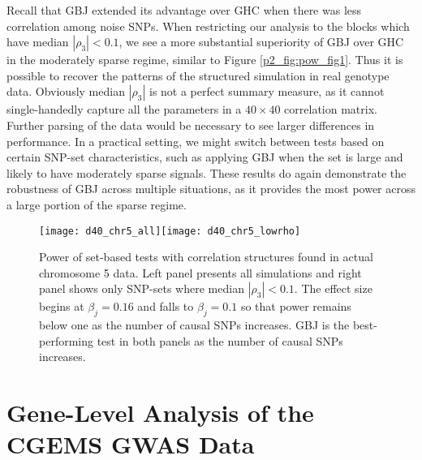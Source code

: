 \documentclass[12pt]{article}
\begin{document}
Recall that GBJ extended its advantage over GHC when there was less correlation among noise SNPs.
When restricting our analysis to the blocks which have median $|\rho_{3}| < 0.1$, we see
a more substantial superiority of GBJ over GHC in the moderately sparse regime, similar to Figure 
\ref{p2_fig:pow_fig1}.
Thus it is possible to recover the patterns of the structured simulation in real genotype data.
Obviously median $|\rho_{3}|$ is not a perfect summary measure, as it cannot single-handedly
capture all the parameters in a $40 \times 40$ correlation matrix.
Further parsing of the data would be necessary to see larger differences in performance.
In a practical setting, we might switch between tests based on certain SNP-set characteristics,
such as applying GBJ when the set is large and likely to have moderately sparse signals.
These results do again demonstrate the robustness of GBJ across multiple situations, as
it provides the most power across a large portion of the sparse regime.


\begin{figure}
\begin{center}
\centerline{\texttt{[image: d40\_chr5\_all]}\texttt{[image: d40\_chr5\_lowrho]}}
\end{center}
\caption{
Power of set-based tests with correlation structures found in actual chromosome 5 data.  Left panel presents all simulations and right panel shows only SNP-sets where median $|\rho_{3}|<0.1$. The effect size begins at $\beta_{j}=0.16$ and falls to $\beta_{j}=0.1$ so that power remains below one as the number of causal SNPs increases. GBJ is the best-performing test in both panels as the number of causal SNPs increases.}
\label{p2_fig:pow_fig_chr5}
\end{figure}



\section{Gene-Level Analysis of the CGEMS GWAS Data}
\label{p2_sec:CGEMS}
\end{document}
